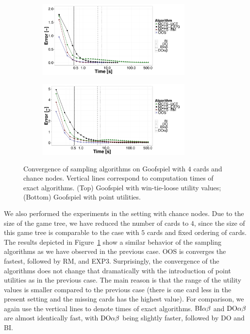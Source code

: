 \begin{figure}
	\begin{subfigure}{1\textwidth}
		\centering
		\includegraphics[width=0.85\textwidth]{figures/convergence-gs-tn.pdf}%
	\end{subfigure}
	\begin{subfigure}{1\textwidth}
		\centering
		\includegraphics[width=0.85\textwidth]{figures/convergence-gs-fn.pdf}%
	\end{subfigure}
\caption{Convergence of sampling algorithms on Goofspiel with $4$ cards and chance nodes.
Vertical lines correspond to computation times of exact algorithms.
(Top) Goofspiel with win-tie-loose utility values; 
(Bottom) Goofspiel with point utilities.} \label{fig:off:conv:gsn}
\end{figure}

We also performed the experiments in the setting with chance nodes.
Due to the size of the game tree, we have reduced the number of cards to $4$, since the size of this game tree is comparable to the case with $5$ cards and fixed ordering of cards.
The results depicted in Figure~\ref{fig:off:conv:gsn} show a similar behavior of the sampling algorithms as we have observed in the previous case.
OOS is converges the fastest, followed by RM, and EXP3.
Surprisingly, the convergence of the algorithms does not change that dramatically with the introduction of point utilities as in the previous case.
The main reason is that the range of the utility values is smaller compared to the previous case (there is one card less in the present setting and the missing cards has the highest value).
For comparison, we again use the vertical lines to denote times of exact algorithms.
$\textrm{BI}\alpha\beta$ and $\textrm{DO}\alpha\beta$ are almost identically fast, with $\textrm{DO}\alpha\beta$ being slightly faster, followed by \textsc{DO} and \textsc{BI}.


